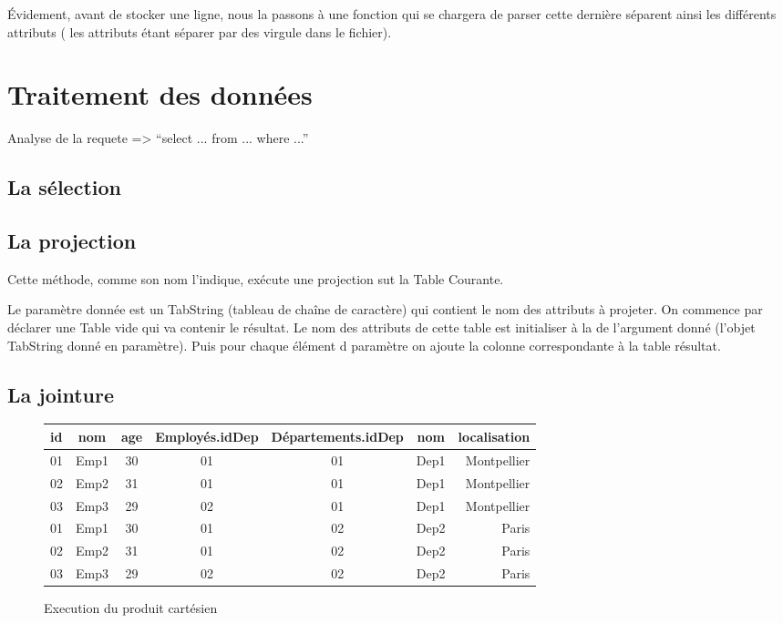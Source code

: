 \documentclass[oneside,13pt,a4paper]{report}
\begin{document}
Évidement, avant de stocker une ligne, nous la passons à une fonction qui se chargera de parser cette dernière séparent ainsi les différents attributs ( les attributs étant séparer par des virgule dans le fichier).

\section{Traitement des données}

Analyse de la requete => \enquote{select ... from ... where ...}

\subsection{La sélection}

\subsection{La projection}

Cette méthode, comme son nom l'indique, exécute une projection sut la Table Courante.

Le paramètre donnée est un TabString (tableau de chaîne de caractère) qui contient le nom des attributs à projeter.
On commence par déclarer une Table vide qui va contenir le résultat.
Le nom des attributs de cette table est initialiser à la de l'argument donné (l'objet TabString donné en paramètre).
Puis pour chaque élément d paramètre on ajoute la colonne correspondante à la table résultat.

\subsection{La jointure}
	\begin{figure}
		\centering
		\caption{Execution du produit cartésien}
		\begin{tabular}{|l|c|c|c|c|c|r|}
			\hline
			id   & nom  & age & Employés.idDep & Départements.idDep & nom   & localisation 
			\\
			\hline
			01 & Emp1 &  30 & 01 & 01 & Dep1 &  Montpellier \\
			02 & Emp2 &  31 & 01 & 01 & Dep1 &  Montpellier \\
			03 & Emp3 &  29 & 02 & 01 & Dep1 &  Montpellier \\
			01 & Emp1 &  30 & 01 & 02 & Dep2 &  Paris \\
			02 & Emp2 &  31 & 01 & 02 & Dep2 &  Paris \\
			03 & Emp3 &  29 & 02 & 02 & Dep2 &  Paris \\
			\hline
		\end{tabular}
	\end{figure}
\end{document}
